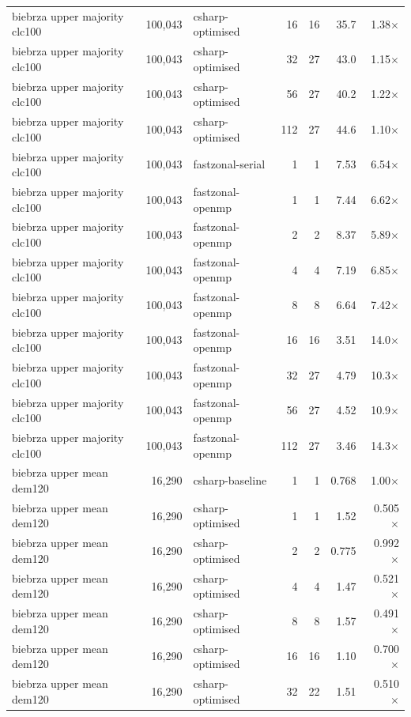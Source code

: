 \begin{tabular}{lrlrrrr}
biebrza upper majority clc100 & 100,043 & csharp-optimised & 16 & 16 & 35.7 & 1.38$\times$ \\
biebrza upper majority clc100 & 100,043 & csharp-optimised & 32 & 27 & 43.0 & 1.15$\times$ \\
biebrza upper majority clc100 & 100,043 & csharp-optimised & 56 & 27 & 40.2 & 1.22$\times$ \\
biebrza upper majority clc100 & 100,043 & csharp-optimised & 112 & 27 & 44.6 & 1.10$\times$ \\
biebrza upper majority clc100 & 100,043 & fastzonal-serial & 1 & 1 & 7.53 & 6.54$\times$ \\
biebrza upper majority clc100 & 100,043 & fastzonal-openmp & 1 & 1 & 7.44 & 6.62$\times$ \\
biebrza upper majority clc100 & 100,043 & fastzonal-openmp & 2 & 2 & 8.37 & 5.89$\times$ \\
biebrza upper majority clc100 & 100,043 & fastzonal-openmp & 4 & 4 & 7.19 & 6.85$\times$ \\
biebrza upper majority clc100 & 100,043 & fastzonal-openmp & 8 & 8 & 6.64 & 7.42$\times$ \\
biebrza upper majority clc100 & 100,043 & fastzonal-openmp & 16 & 16 & 3.51 & 14.0$\times$ \\
biebrza upper majority clc100 & 100,043 & fastzonal-openmp & 32 & 27 & 4.79 & 10.3$\times$ \\
biebrza upper majority clc100 & 100,043 & fastzonal-openmp & 56 & 27 & 4.52 & 10.9$\times$ \\
biebrza upper majority clc100 & 100,043 & fastzonal-openmp & 112 & 27 & 3.46 & 14.3$\times$ \\
biebrza upper mean dem120 & 16,290 & csharp-baseline & 1 & 1 & 0.768 & 1.00$\times$ \\
biebrza upper mean dem120 & 16,290 & csharp-optimised & 1 & 1 & 1.52 & 0.505$\times$ \\
biebrza upper mean dem120 & 16,290 & csharp-optimised & 2 & 2 & 0.775 & 0.992$\times$ \\
biebrza upper mean dem120 & 16,290 & csharp-optimised & 4 & 4 & 1.47 & 0.521$\times$ \\
biebrza upper mean dem120 & 16,290 & csharp-optimised & 8 & 8 & 1.57 & 0.491$\times$ \\
biebrza upper mean dem120 & 16,290 & csharp-optimised & 16 & 16 & 1.10 & 0.700$\times$ \\
biebrza upper mean dem120 & 16,290 & csharp-optimised & 32 & 22 & 1.51 & 0.510$\times$ \\

\end{tabular}
